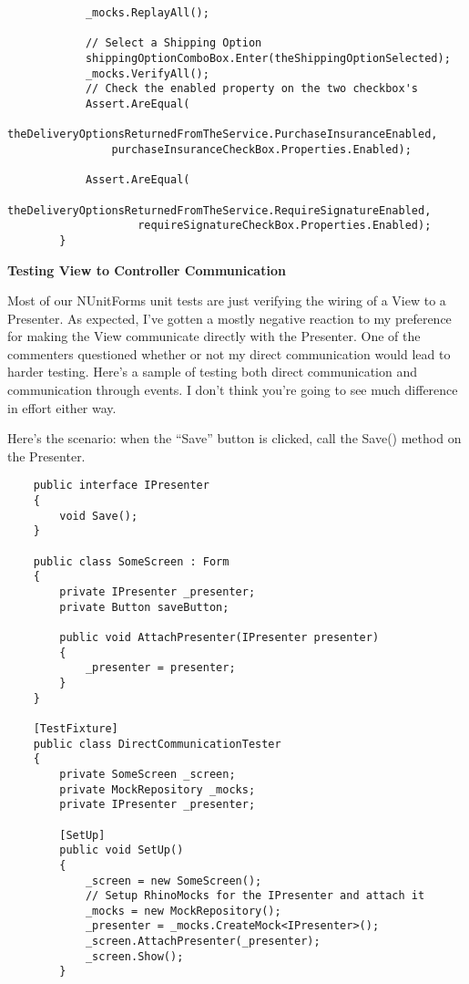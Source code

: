 \documentclass{article}
\begin{document}
{\begin{lstlisting}
            _mocks.ReplayAll(); 

            // Select a Shipping Option
            shippingOptionComboBox.Enter(theShippingOptionSelected);
            _mocks.VerifyAll();
            // Check the enabled property on the two checkbox's
            Assert.AreEqual(
                theDeliveryOptionsReturnedFromTheService.PurchaseInsuranceEnabled,
                purchaseInsuranceCheckBox.Properties.Enabled); 

            Assert.AreEqual(
                    theDeliveryOptionsReturnedFromTheService.RequireSignatureEnabled,
                    requireSignatureCheckBox.Properties.Enabled);
        }
\end{lstlisting}
 
\Large {\textbf{Testing View to Controller Communication }}

Most of our NUnitForms unit tests are just verifying the wiring of a View to a Presenter.  As expected, I've gotten a mostly negative reaction to my preference for making the View communicate directly with the Presenter.  One of the commenters questioned whether or not my direct communication would lead to harder testing.  Here's a sample of testing both direct communication and communication through events.  I don't think you're going to see much difference in effort either way.

Here's the scenario:  when the “Save” button is clicked, call the Save() method on the Presenter. 
\newpage
\begin{lstlisting}
    public interface IPresenter
    {
        void Save();
    }

    public class SomeScreen : Form
    {
        private IPresenter _presenter;
        private Button saveButton; 

        public void AttachPresenter(IPresenter presenter)
        {
            _presenter = presenter;
        }
    }

    [TestFixture]
    public class DirectCommunicationTester
    {
        private SomeScreen _screen;
        private MockRepository _mocks;
        private IPresenter _presenter; 

        [SetUp]
        public void SetUp()
        {
            _screen = new SomeScreen();
            // Setup RhinoMocks for the IPresenter and attach it
            _mocks = new MockRepository();
            _presenter = _mocks.CreateMock<IPresenter>();
            _screen.AttachPresenter(_presenter);
            _screen.Show();
        } 


\end{lstlisting}}
\end{document}
